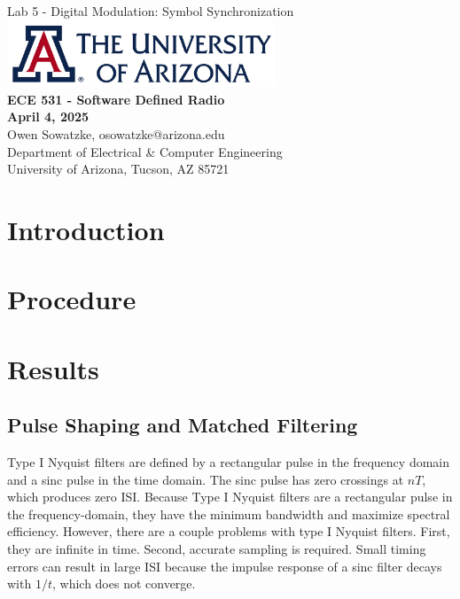 \documentclass{article}
\begin{document}
\begin{titlepage}
	\centering
	{\huge Lab 5 - Digital Modulation: Symbol Synchronization}\\[0.25 in]
	\includegraphics[width=0.6\textwidth]{ua_logo.png}\\[0.25 in]
	{\large \textbf{ECE 531 - Software Defined Radio\\[0.25 in]
	April 4, 2025\\[0.25 in]}}
	{\large Owen Sowatzke, osowatzke@arizona.edu\\[0.05 in]
	Department of Electrical \& Computer Engineering\\[0.05 in]
	University of Arizona, Tucson, AZ 85721\\[0.5 in]}
	\hypersetup{linkcolor=navy-blue}
	\noindent\hrulefill
	\tableofcontents
	\noindent\hrulefill
\end{titlepage}


\section{Introduction}

\section{Procedure}

\section{Results}

\subsection{Pulse Shaping and Matched Filtering}

Type I Nyquist filters are defined by a rectangular pulse in the frequency domain and a sinc pulse in the time domain. The sinc pulse has zero crossings at $nT$, which produces zero ISI. Because Type I Nyquist filters are a rectangular pulse in the frequency-domain, they have the minimum bandwidth and maximize spectral efficiency. However, there are a couple problems with type I Nyquist filters. First, they are infinite in time. Second, accurate sampling is required. Small timing errors can result in large ISI because the impulse response of a sinc filter decays with $1/t$, which does not converge.
\end{document}
